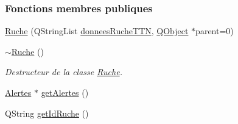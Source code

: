 \subsubsection*{Fonctions membres publiques}
\begin{DoxyCompactItemize}
\item 
\hyperlink{class_ruche_a8b4ee3752d984c5acee93b990db7939a}{Ruche} (Q\+String\+List \hyperlink{class_ruche_a4556832042641c08a6ef2ab9d80d771e}{donnees\+Ruche\+T\+TN}, \hyperlink{class_q_object}{Q\+Object} $\ast$parent=0)
\item 
\hyperlink{class_ruche_ad3f950d0731f9801f06dd6ae09f2e5fa}{$\sim$\+Ruche} ()
\begin{DoxyCompactList}\small\item\em Destructeur de la classe \hyperlink{class_ruche}{Ruche}. \end{DoxyCompactList}\item 
\hyperlink{class_alertes}{Alertes} $\ast$ \hyperlink{class_ruche_a9edbc2e81ccb2cb76de43639bcb16ec1}{get\+Alertes} ()
\item 
Q\+String \hyperlink{class_ruche_a9f2de5ef29557ec7a53d5e22df34d164}{get\+Id\+Ruche} ()
\end{DoxyCompactItemize}
